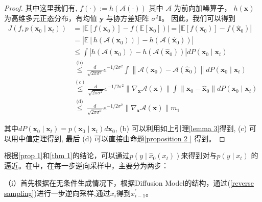\begin{theorem}[定理1的证明]
\begin{proof}
其中这里我们有, $f(\cdot):=h(\mathcal{A}(\cdot))$ 其中 $\mathcal{A}$ 为前向加噪算子，  $h(\boldsymbol{x})$ 为高维多元正态分布，有均值 $\boldsymbol{y}$ 与协方差矩阵 $\sigma^2 \boldsymbol{I}$。 因此，我们可以得到
\begin{align}
J\left(f, p\left(\boldsymbol{x}_0 \mid \boldsymbol{x}_t\right)\right) & =\left|\mathbb{E}\left[f\left(\boldsymbol{x}_0\right)\right]-f\left(\mathbb{E}\left[\boldsymbol{x}_0\right]\right)\right|=\left|\mathbb{E}\left[f\left(\boldsymbol{x}_0\right)\right]-f\left(\hat{\boldsymbol{x}}_0\right)\right| \\
& =\left|\mathbb{E}\left[h\left(\mathcal{A}\left(\boldsymbol{x}_0\right)\right)\right]-h\left(\mathcal{A}\left(\hat{\boldsymbol{x}}_0\right)\right)\right| \\
& \leq \int\left|h\left(\mathcal{A}\left(\boldsymbol{x}_0\right)\right)-h\left(\mathcal{A}\left(\hat{\boldsymbol{x}}_0\right)\right)\right| d P\left(\boldsymbol{x}_0 \mid \boldsymbol{x}_t\right) \\
& \stackrel{\text { (b) }}{\leq} \frac{d}{\sqrt{2 \pi \sigma^2}} e^{-1 / 2 \sigma^2} \int\left\|\mathcal{A}\left(\boldsymbol{x}_0\right)-\mathcal{A}\left(\hat{\boldsymbol{x}}_0\right)\right\| d P\left(\boldsymbol{x}_0 \mid \boldsymbol{x}_t\right) \\
& \stackrel{(c)}{\leq} \frac{d}{\sqrt{2 \pi \sigma^2}} e^{-1 / 2 \sigma^2}\left\|\nabla_{\boldsymbol{x}} \mathcal{A}(\boldsymbol{x})\right\| \int\left\|\boldsymbol{x}_0-\hat{\boldsymbol{x}}_0\right\| d P\left(\boldsymbol{x}_0 \mid \boldsymbol{x}_t\right) \\
& \stackrel{\text { (d) }}{\leq} \frac{d}{\sqrt{2 \pi \sigma^2}} e^{-1 / 2 \sigma^2}\left\|\nabla_{\boldsymbol{x}} \mathcal{A}(\boldsymbol{x})\right\| m_1
\end{align}

其中$d P\left(\boldsymbol{x}_0 \mid \boldsymbol{x}_t\right)=p\left(\boldsymbol{x}_0 \mid \boldsymbol{x}_t\right) d \boldsymbol{x}_0$, (b) 可以利用如上引理\ref{lemma 3}得到, (c) 可以用中值定理得到, 最后 (d) 可以直接由命题\ref{proposition 2 } 得到。 
\end{proof}
\end{theorem}

根据\ref{prop 1}和\ref{thm 1}的结论，可以通过$p(y\mid \hat{x}_0(x_t))$来得到对与$p(y\mid x_t)$
的逼近。在\cite{Inverse}中，在每一步逆向采样中，主要分为两步：   

（i）首先根据在无条件生成情况下，根据Diffusion Model的结构，通过(\ref{reverse sampling})进行一步逆向采样,通过$x_i$得到$x_{i-1}^{\prime}$。    

